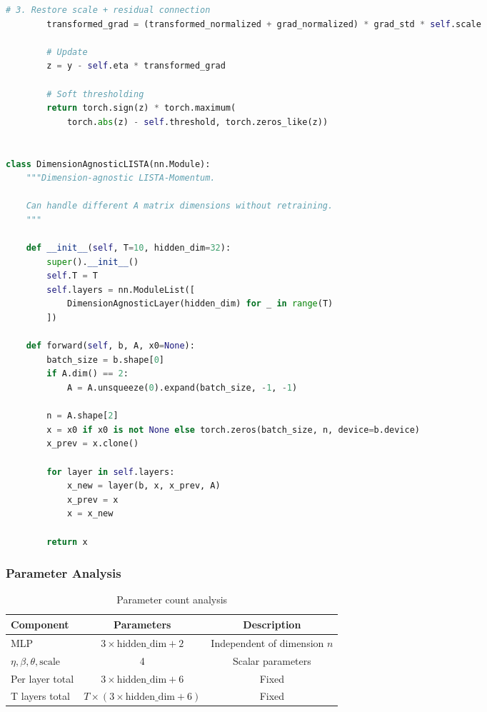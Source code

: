 \documentclass[11pt,a4paper]{article}
\begin{document}
\begin{lstlisting}[language=Python]
        # 3. Restore scale + residual connection
        transformed_grad = (transformed_normalized + grad_normalized) * grad_std * self.scale

        # Update
        z = y - self.eta * transformed_grad

        # Soft thresholding
        return torch.sign(z) * torch.maximum(
            torch.abs(z) - self.threshold, torch.zeros_like(z))


class DimensionAgnosticLISTA(nn.Module):
    """Dimension-agnostic LISTA-Momentum.

    Can handle different A matrix dimensions without retraining.
    """

    def __init__(self, T=10, hidden_dim=32):
        super().__init__()
        self.T = T
        self.layers = nn.ModuleList([
            DimensionAgnosticLayer(hidden_dim) for _ in range(T)
        ])

    def forward(self, b, A, x0=None):
        batch_size = b.shape[0]
        if A.dim() == 2:
            A = A.unsqueeze(0).expand(batch_size, -1, -1)

        n = A.shape[2]
        x = x0 if x0 is not None else torch.zeros(batch_size, n, device=b.device)
        x_prev = x.clone()

        for layer in self.layers:
            x_new = layer(b, x, x_prev, A)
            x_prev = x
            x = x_new

        return x
\end{lstlisting}

\subsubsection{Parameter Analysis}

\begin{table}[h]
\centering
\begin{tabular}{lcc}
\toprule
\textbf{Component} & \textbf{Parameters} & \textbf{Description} \\
\midrule
MLP & $3 \times \text{hidden\_dim} + 2$ & Independent of dimension $n$ \\
$\eta, \beta, \theta, \text{scale}$ & 4 & Scalar parameters \\
Per layer total & $3 \times \text{hidden\_dim} + 6$ & Fixed \\
T layers total & $T \times (3 \times \text{hidden\_dim} + 6)$ & Fixed \\
\bottomrule
\end{tabular}
\caption{Parameter count analysis}
\label{tab:param_count}
\end{table}
\end{document}

